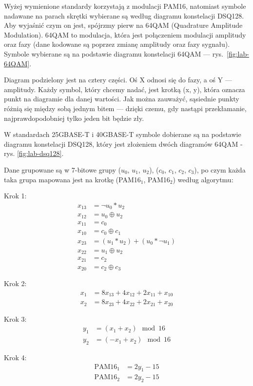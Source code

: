 Wyżej wymienione standardy korzystają z modulacji PAM16, natomiast symbole nadawane na parach skrętki wybierane są według diagramu
konstelacji DSQ128. Aby wyjaśnić czym on jest, spójrzmy pierw na 64QAM (Quadrature Amplitude Modulation). 64QAM to modulacja, która jest
połączeniem modulacji amplitudy oraz fazy (dane kodowane są poprzez zmianę amplitudy oraz fazy sygnału). Symbole wybierane są na podstawie
diagramu konstelacji 64QAM --- rys.~\ref{fig:lab-64QAM}.

Diagram podzielony jest na cztery części. Oś X odnosi się do fazy, a oś Y --- amplitudy. Każdy symbol, który chcemy nadać,
jest krotką (x, y), która oznacza punkt na diagramie dla danej wartości. Jak można zauważyć, sąsiednie punkty różnią się
między sobą jednym bitem --- dzięki czemu, gdy nastąpi przekłamanie, najprawdopodobniej tylko jeden bit będzie zły.

W standardach 25GBASE-T i 40GBASE-T symbole dobierane są na podstawie diagramu konstelacji DSQ128, który jest złożeniem dwóch
diagramów 64QAM - rys. \ref{fig:lab-dsq128}.

Dane grupowane są w 7-bitowe grupy ($u_0$, $u_1$, $u_2$), ($c_0$, $c_1$, $c_2$, $c_3$), po czym każda taka grupa mapowana jest na krotkę (PAM16$_1$, PAM16$_2$) według algorytmu:

Krok 1:
\begin{align*}
    x_{13} &= \neg u_0 * u_2 \\
    x_{12} &= u_0 \oplus u_2 \\
    x_{11} &= c_0 \\
    x_{10} &= c_0 \oplus c_1 \\
    x_{23} &= (u_1 * u_2) + (u_0 * \neg u_1) \\
    x_{22} &= u_1 \oplus u_2 \\
    x_{21} &= c_2 \\
    x_{20} &= c_2 \oplus c_3
\end{align*}

Krok 2:
\begin{align*}
    x_1 &= 8x_{13} + 4x_{12} + 2x_{11} + x_{10} \\
    x_2 &= 8x_{23} + 4x_{22} + 2x_{21} + x_{20}
\end{align*}

Krok 3:
\begin{align*}
    y_1 &= (x_1 + x_2) \mod 16 \\
    y_2 &= (-x_1 + x_2) \mod 16
\end{align*}

Krok 4:
\begin{align*}
    \text{PAM16}_1 &= 2y_1 - 15 \\
    \text{PAM16}_2 &= 2y_2 - 15
\end{align*}

